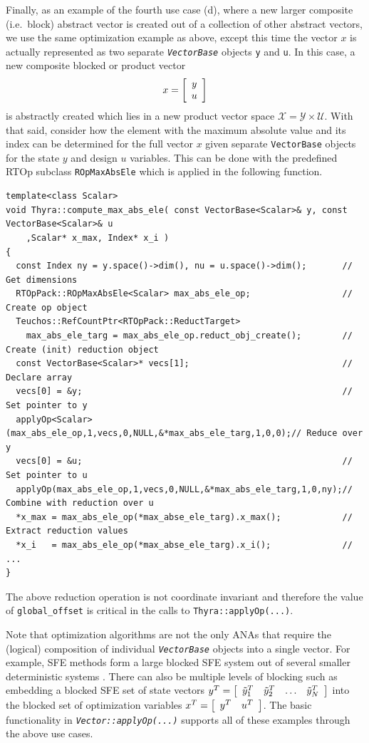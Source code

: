 \documentclass[pdf,ps2pdf,11pt]{SANDreport}
\begin{document}
{}\noindent{}Finally, as an example of the fourth use case (d), where
a new larger composite (i.e.~block) abstract vector is created out of
a collection of other abstract vectors, we use the same optimization
example as above, except this time the vector $x$ is actually
represented as two separate {}\texttt{\textit{Vector\-Base}} objects
{}\texttt{y} and {}\texttt{u}.  In this case, a new composite blocked
or product vector
%
\[
x = {\bmat{c} y \\ u \emat}
\]
%
is abstractly created which lies in a new product vector space
$\mathcal{X} = \mathcal{Y} \times \mathcal{U}$.  With that said,
consider how the element with the maximum absolute value and its index
can be determined for the full vector $x$ given separate
{}\texttt{Vector\-Base} objects for the state $y$ and design $u$ variables.
This can be done with the predefined RTOp subclass
{}\texttt{ROpMax\-AbsEle} which is applied in the following function.

{\scriptsize\begin{verbatim}
template<class Scalar>
void Thyra::compute_max_abs_ele( const VectorBase<Scalar>& y, const VectorBase<Scalar>& u
    ,Scalar* x_max, Index* x_i )
{
  const Index ny = y.space()->dim(), nu = u.space()->dim();       // Get dimensions
  RTOpPack::ROpMaxAbsEle<Scalar> max_abs_ele_op;                  // Create op object
  Teuchos::RefCountPtr<RTOpPack::ReductTarget>
    max_abs_ele_targ = max_abs_ele_op.reduct_obj_create();        // Create (init) reduction object
  const VectorBase<Scalar>* vecs[1];                              // Declare array
  vecs[0] = &y;                                                   // Set pointer to y
  applyOp<Scalar>(max_abs_ele_op,1,vecs,0,NULL,&*max_abs_ele_targ,1,0,0);// Reduce over y
  vecs[0] = &u;                                                   // Set pointer to u
  applyOp(max_abs_ele_op,1,vecs,0,NULL,&*max_abs_ele_targ,1,0,ny);// Combine with reduction over u
  *x_max = max_abs_ele_op(*max_abse_ele_targ).x_max();            // Extract reduction values
  *x_i   = max_abs_ele_op(*max_abse_ele_targ).x_i();              // ...
}
\end{verbatim}}

{}\noindent{}The above reduction operation is not coordinate invariant
and therefore the value of {}\texttt{global\_offset} is critical in
the calls to {}\texttt{Thyra\-::applyOp(\-...)}.

Note that optimization algorithms are not the only ANAs that require
the (logical) composition of individual {}\texttt{\textit{Vector\-Base}}
objects into a single vector.  For example, SFE methods form a large
blocked SFE system out of several smaller deterministic systems
{}\cite{ref:sfe}.  There can also be multiple levels of blocking such
as embedding a blocked SFE set of state vectors $y^T = \bmat{cccc}
\tilde{y}_1^T & \tilde{y}_2^T & \ldots & \tilde{y}_N^T \emat$ into the blocked set of
optimization variables $x^T = \bmat{cc} y^T & u^T \emat$.  The basic
functionality in {}\texttt{\textit{Vector\-::applyOp(\-...)}} supports
all of these examples through the above use cases.
\end{document}
